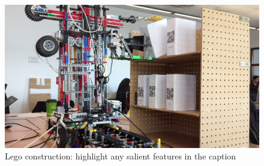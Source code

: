 \documentclass{article}
\begin{document}




\begin{figure}[tb]
\vskip 5mm
\begin{center}
\centerline{\includegraphics[width=\columnwidth]{figs/crane}}
\caption{Lego construction: highlight any salient features in the caption}
\label{fig:sample-fig}
\end{center}
\vskip -5mm
\end{figure} 
\end{document}
